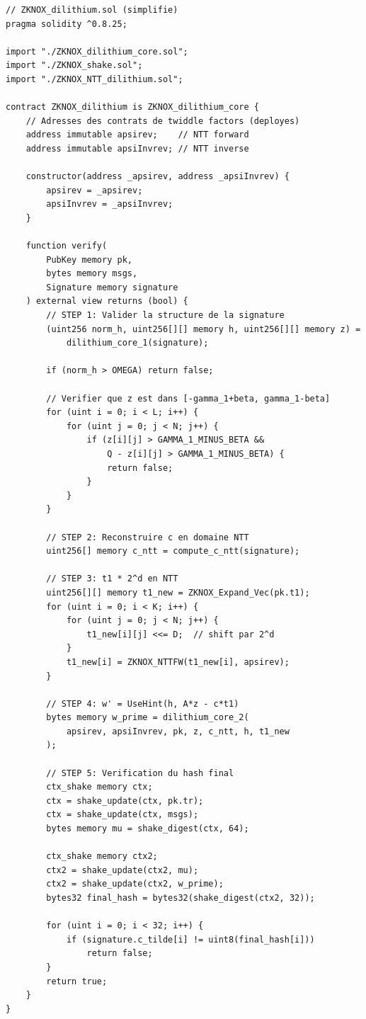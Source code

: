 \documentclass[12pt, a4paper]{article}
\begin{document}
\begin{lstlisting}[style=solidity]
// ZKNOX_dilithium.sol (simplifie)
pragma solidity ^0.8.25;

import "./ZKNOX_dilithium_core.sol";
import "./ZKNOX_shake.sol";
import "./ZKNOX_NTT_dilithium.sol";

contract ZKNOX_dilithium is ZKNOX_dilithium_core {
    // Adresses des contrats de twiddle factors (deployes)
    address immutable apsirev;    // NTT forward
    address immutable apsiInvrev; // NTT inverse

    constructor(address _apsirev, address _apsiInvrev) {
        apsirev = _apsirev;
        apsiInvrev = _apsiInvrev;
    }

    function verify(
        PubKey memory pk,
        bytes memory msgs,
        Signature memory signature
    ) external view returns (bool) {
        // STEP 1: Valider la structure de la signature
        (uint256 norm_h, uint256[][] memory h, uint256[][] memory z) =
            dilithium_core_1(signature);

        if (norm_h > OMEGA) return false;

        // Verifier que z est dans [-gamma_1+beta, gamma_1-beta]
        for (uint i = 0; i < L; i++) {
            for (uint j = 0; j < N; j++) {
                if (z[i][j] > GAMMA_1_MINUS_BETA &&
                    Q - z[i][j] > GAMMA_1_MINUS_BETA) {
                    return false;
                }
            }
        }

        // STEP 2: Reconstruire c en domaine NTT
        uint256[] memory c_ntt = compute_c_ntt(signature);

        // STEP 3: t1 * 2^d en NTT
        uint256[][] memory t1_new = ZKNOX_Expand_Vec(pk.t1);
        for (uint i = 0; i < K; i++) {
            for (uint j = 0; j < N; j++) {
                t1_new[i][j] <<= D;  // shift par 2^d
            }
            t1_new[i] = ZKNOX_NTTFW(t1_new[i], apsirev);
        }

        // STEP 4: w' = UseHint(h, A*z - c*t1)
        bytes memory w_prime = dilithium_core_2(
            apsirev, apsiInvrev, pk, z, c_ntt, h, t1_new
        );

        // STEP 5: Verification du hash final
        ctx_shake memory ctx;
        ctx = shake_update(ctx, pk.tr);
        ctx = shake_update(ctx, msgs);
        bytes memory mu = shake_digest(ctx, 64);

        ctx_shake memory ctx2;
        ctx2 = shake_update(ctx2, mu);
        ctx2 = shake_update(ctx2, w_prime);
        bytes32 final_hash = bytes32(shake_digest(ctx2, 32));

        for (uint i = 0; i < 32; i++) {
            if (signature.c_tilde[i] != uint8(final_hash[i]))
                return false;
        }
        return true;
    }
}
\end{lstlisting}
\end{document}
